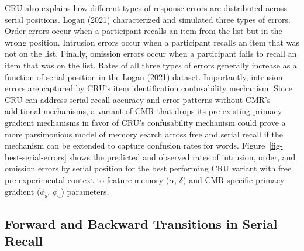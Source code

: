 \documentclass[
  letterpaper,
  DIV=11,
  numbers=noendperiod]{scrartcl}
\begin{document}
CRU also explains how different types of response errors are distributed
across serial positions. Logan (2021) characterized and simulated three
types of errors. Order errors occur when a participant recalls an item
from the list but in the wrong position. Intrusion errors occur when a
participant recalls an item that was not on the list. Finally, omission
errors occur when a participant fails to recall an item that was on the
list. Rates of all three types of errors generally increase as a
function of serial position in the Logan (2021) dataset. Importantly,
intrusion errors are captured by CRU's item identification confusability
mechanism. Since CRU can address serial recall accuracy and error
patterns without CMR's additional mechanisms, a variant of CMR that
drops its pre-existing primacy gradient mechanisms in favor of CRU's
confusability mechanism could prove a more parsimonious model of memory
search across free and serial recall if the mechanism can be extended to
capture confusion rates for words. Figure~\ref{fig-best-serial-errors}
shows the predicted and observed rates of intrusion, order, and omission
errors by serial position for the best performing CRU variant with free
pre-experimental context-to-feature memory (\(\alpha\), \(\delta\)) and
CMR-specific primacy gradient (\(\phi_\text{s}\), \(\phi_\text{d}\))
parameters.

\subsection{Forward and Backward Transitions in Serial
Recall}\label{forward-and-backward-transitions-in-serial-recall}
\end{document}
